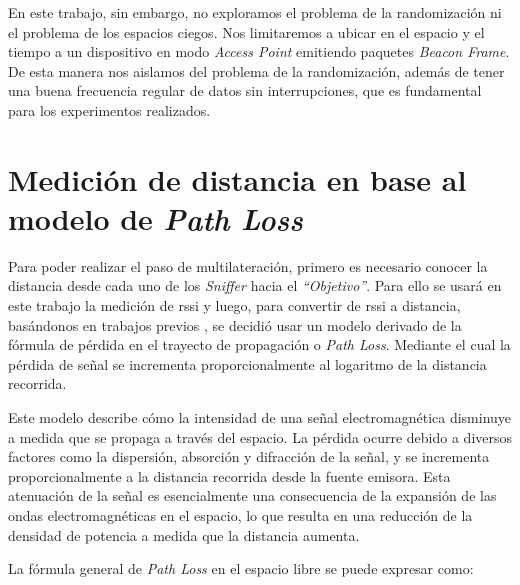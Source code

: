 En este trabajo, sin embargo, no exploramos el problema de la randomización ni el problema de los espacios ciegos. Nos limitaremos a ubicar en el espacio y el tiempo a un dispositivo en modo \emph{Access Point} emitiendo paquetes \emph{Beacon Frame}. De esta manera nos aislamos del problema de la randomización, además de tener una buena frecuencia regular de datos sin interrupciones, que es fundamental para los experimentos realizados.

\section{Medición de distancia en base al modelo de \textit{Path Loss}}

Para poder realizar el paso de multilateración, primero es necesario conocer la distancia desde cada uno de los \emph{Sniffer} hacia el \emph{“Objetivo”}. Para ello se usará en este trabajo la medición de \acs{rssi} y luego, para convertir de \acs{rssi} a distancia, basándonos en trabajos previos \cite{doi:10.4236/wsn.2010.28072} \cite{doi:10.1155/2014/371350}, se decidió usar un modelo derivado de la fórmula de pérdida en el trayecto de propagación o \emph{Path Loss}. Mediante el cual la pérdida de señal se incrementa proporcionalmente al logaritmo de la distancia recorrida.

Este modelo describe cómo la intensidad de una señal electromagnética disminuye a medida que se propaga a través del espacio. La pérdida ocurre debido a diversos factores como la dispersión, absorción y difracción de la señal, y se incrementa proporcionalmente a la distancia recorrida desde la fuente emisora. Esta atenuación de la señal es esencialmente una consecuencia de la expansión de las ondas electromagnéticas en el espacio, lo que resulta en una reducción de la densidad de potencia a medida que la distancia aumenta.

\newline
\newline

La fórmula general de \emph{Path Loss} en el espacio libre se puede expresar como:

